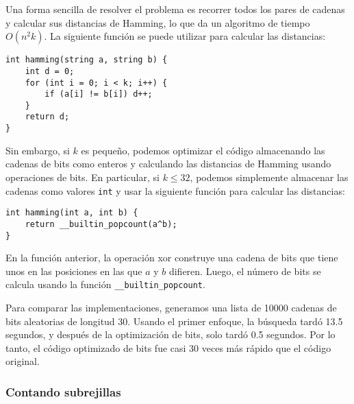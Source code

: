 Una forma sencilla de resolver el problema es recorrer todos los pares de cadenas y calcular sus distancias de Hamming,
lo que da un algoritmo de tiempo $O(n^2 k)$.
La siguiente función se puede utilizar para calcular las distancias:
\begin{lstlisting}
int hamming(string a, string b) {
    int d = 0;
    for (int i = 0; i < k; i++) {
        if (a[i] != b[i]) d++;
    }
    return d;
}
\end{lstlisting}

Sin embargo, si $k$ es pequeño, podemos optimizar el código almacenando las cadenas de bits como enteros y calculando las distancias de Hamming usando operaciones de bits.
En particular, si $k \le 32$, podemos simplemente almacenar las cadenas como valores \texttt{int} y usar la siguiente función para calcular las distancias:
\begin{lstlisting}
int hamming(int a, int b) {
    return __builtin_popcount(a^b);
}
\end{lstlisting}
En la función anterior, la operación xor construye una cadena de bits que tiene unos en las posiciones en las que $a$ y $b$ difieren.
Luego, el número de bits se calcula usando la función \texttt{\_\_builtin\_popcount}.

Para comparar las implementaciones, generamos una lista de 10000 cadenas de bits aleatorias de longitud 30.
Usando el primer enfoque, la búsqueda tardó 13.5 segundos, y después de la optimización de bits, solo tardó 0.5 segundos.
Por lo tanto, el código optimizado de bits fue casi 30 veces más rápido que el código original.

\subsubsection{Contando subrejillas}

